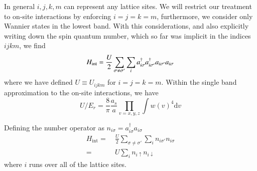 \documentclass[oneside,11pt]{memoir}
\newcommand{\bv}[1]{\ensuremath{\bm{#1}}}
\newcommand{\bvo}{\ensuremath{\bv{V}_{0}}}
\newcommand{\er}{\ensuremath{E_{r}}}
\newcommand{\spup}{\ensuremath{ \uparrow }}
\newcommand{\spdn}{\ensuremath{ \downarrow}}
\begin{document}
In general $i,j,k,m$ can represent any lattice sites.  We will restrict
our treatment to on-site interactions by enforcing $i=j=k=m$,  furthermore, we
consider only Wannier states in the lowest band. 
With this considerations, and also explicitly writing down the spin quantum
number, which so far was implicit in the indices $ijkm$, we find 
\begin{equation}
   H_{\text{int}} =  
           \frac{U}{2}\sum_{\sigma\neq\sigma'}\sum_{i} 
           a_{i\sigma}^{\dagger} a_{i\sigma'}^{\dagger} a_{i\sigma'} a_{i\sigma} \\
\end{equation}
where we have defined $U\equiv U_{ijkm}$ for $i=j=k=m$. 
Within the single band approximation to the on-site interactions, we have  
\begin{equation}
  U/\er = \frac{ 8}{ \pi}  \frac{ a_{s} }{a}
   \prod_{v=x,y,z}  \int  w(v) ^{4} \mathrm{d}v  
\end{equation}

Defining the number operator as $n_{i\sigma} = a_{i\sigma}^{\dagger}
a_{i\sigma}$ 
\begin{equation}
\begin{split}
   H_{\text{int}}  
     = & \  
           \frac{U}{2}\sum_{\sigma\neq\sigma'}\sum_{i}
           n_{i\sigma'} n_{i\sigma}  \\
     = & \ 
           U\sum_{i}
           n_{i\spup} n_{i\spdn}  
\end{split}
\end{equation}
where $i$ runs over all of the lattice sites.  
\end{document}
